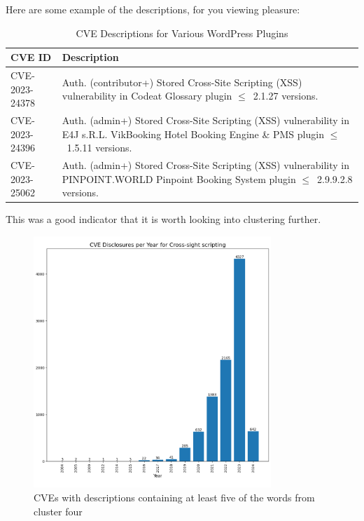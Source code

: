 \documentclass[12pt]{article}
\begin{document}
Here are some example of the descriptions, for you viewing pleasure:

\begin{table}[h]
	\centering
	\begin{tabular}{|p{}|p{}|}
		\hline
		\textbf{CVE ID} & \textbf{Description}                                                    \\
		\hline

		CVE-2023-24378  & Auth. (contributor+) Stored Cross-Site Scripting (XSS) vulnerability in
		Codeat Glossary plugin $\leq$~2.1.27 versions.                                            \\

		\hline

		CVE-2023-24396  & Auth. (admin+) Stored Cross-Site Scripting (XSS) vulnerability in E4J
		s.R.L. VikBooking Hotel Booking Engine \& PMS plugin $\leq$~1.5.11 versions.              \\

		\hline

		CVE-2023-25062  & Auth. (admin+) Stored Cross-Site Scripting (XSS) vulnerability in
		PINPOINT.WORLD Pinpoint Booking System plugin $\leq$~2.9.9.2.8 versions.                  \\

		\hline
	\end{tabular}
	\caption{CVE Descriptions for Various WordPress Plugins}
	\label{tab:cve-descriptions}
\end{table}

This was a good indicator that it is worth looking into clustering further.

\begin{figure}[H]
	\centering

	\includegraphics[width=0.8\textwidth]{figures/cross_site_per_year.pdf}
	\caption{\label{fig:cross_site_per_year}CVEs with descriptions containing at least five of the
		words from cluster four}
\end{figure}
\end{document}
